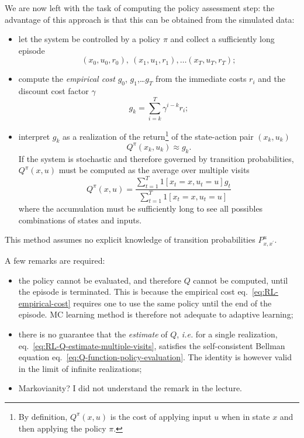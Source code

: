 We are now left with the task of computing the policy assessment step: the advantage of this approach is that this can be obtained from the simulated data:
\begin{itemize}
\item let the system be controlled by a policy $\pi$ and collect a sufficiently long episode
  \begin{equation*}
    (x_0,u_0,r_0),\ (x_1,u_1,r_1),\ldots (x_T,u_T,r_T);
  \end{equation*}
\item compute the \emph{empirical cost} $g_0$, $g_1$,\ldots $g_T$ from the immediate costs $r_i$ and the discount cost factor $\gamma$
  \begin{equation}
    \label{eq:RL-empirical-cost}
    g_k = \sum_{i=k}^T \gamma^{i-k}r_i;
  \end{equation}
\item interpret $g_k$ as a realization of the return\footnote{By definition, $Q^\pi(x,u)$ is the cost of applying input $u$ when in state $x$ and then applying the policy $\pi$.} of the state-action pair $(x_k,u_k)$
  \begin{equation*}
    Q^\pi(x_k,u_k) \approx g_k.
  \end{equation*}
  If the system is stochastic and therefore governed by transition probabilities, $Q^\pi(x,u)$ must be computed as the average over multiple visits
  \begin{equation}
    \label{eq:RL-Q-estimate-multiple-visits}
    Q^\pi(x,u) = \frac{\sum_{t=1}^T 1[x_t=x,u_t=u]g_t}{\sum_{t=1}^T 1[x_t=x,u_t=u]}
  \end{equation}
  where the accumulation must be sufficiently long to see all possibles combinations of states and inputs.
\end{itemize}
This method assumes no explicit knowledge of transition probabilities $P_{x,x^\prime}^u$.

A few remarks are required:
\begin{itemize}
\item the policy cannot be evaluated, and therefore $Q$ cannot be computed, until the episode is terminated. This is because the empirical cost eq.~\eqref{eq:RL-empirical-cost} requires one to use the same policy until the end of the episode. MC learning method is therefore not adequate to adaptive learning;
\item there is no guarantee that the \emph{estimate} of $Q$, \textit{i.e.} for a single realization, eq.~\eqref{eq:RL-Q-estimate-multiple-visits}, satisfies the self-consistent Bellman equation eq.~\eqref{eq:Q-function-policy-evaluation}. The identity is however valid in the limit of infinite realizations;
\item Markovianity? I did not understand the remark in the lecture.
\end{itemize}

